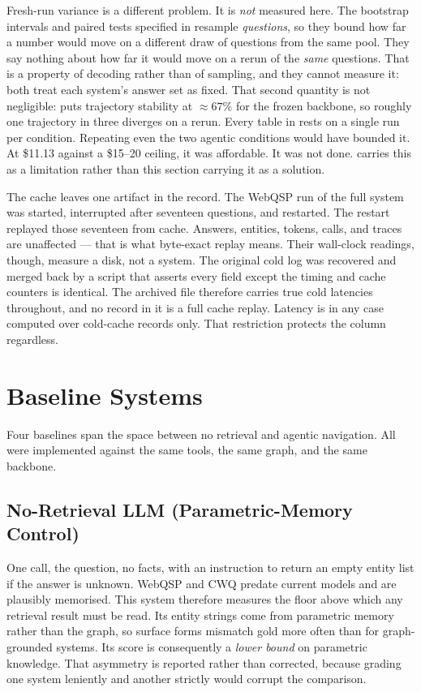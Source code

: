 Fresh-run variance is a different problem. It is \emph{not} measured here.
The bootstrap intervals and paired tests specified in 
resample \emph{questions}, so they bound how far a number would move on a
different draw of questions from the same pool. They say nothing about how far
it would move on a rerun of the \emph{same} questions. That is a property of
decoding rather than of sampling, and they cannot measure it: both treat each
system's answer set as fixed. That second quantity is not negligible:
 puts trajectory stability at $\approx 67\%$ for the frozen
backbone, so roughly one trajectory in three diverges on a rerun. Every
table in  rests on a single run per condition. Repeating even
the two agentic conditions would have bounded it. At \$11.13 against a
\$15--20 ceiling, it was affordable. It was not done.  carries
this as a limitation rather than this section carrying it as a solution.

The cache leaves one artifact in the record. The WebQSP run of the full system
was started, interrupted after seventeen questions, and restarted. The restart
replayed those seventeen from cache. Answers, entities, tokens, calls, and
traces are unaffected --- that is what byte-exact replay means. Their
wall-clock readings, though, measure a disk, not a system. The original cold
log was recovered and merged back by a script that asserts every field except
the timing and cache counters is identical. The archived file therefore
carries true cold latencies throughout, and no record in it is a full cache
replay. Latency is in any case computed over cold-cache records only. That
restriction protects the column regardless.

\section{Baseline Systems}\label{sec:baselines}

Four baselines span the space between no retrieval and agentic navigation. All
were implemented against the same tools, the same graph, and the same backbone.

\subsection{No-Retrieval LLM (Parametric-Memory Control)}

One call, the question, no facts, with an instruction to return an empty entity
list if the answer is unknown. WebQSP and CWQ predate current models and are
plausibly memorised. This system therefore measures the floor above which any
retrieval result must be read. Its entity strings come from parametric memory
rather than the graph, so surface forms mismatch gold more often than for
graph-grounded systems. Its score is consequently a \emph{lower bound} on
parametric knowledge. That asymmetry is reported rather than corrected, because
grading one system leniently and another strictly would corrupt the comparison.

